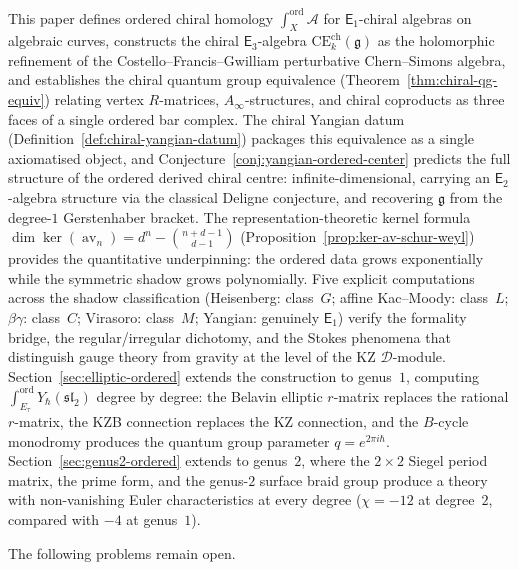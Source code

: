 \documentclass[11pt,reqno]{amsart}
\theoremstyle{definition}
\theoremstyle{remark}
\newcommand{\cA}{\mathcal{A}}
\newcommand{\cD}{\mathcal{D}}
\newcommand{\CE}{\mathrm{CE}}
\newcommand{\Ainf}{A_{\infty}}
\newcommand{\Eone}{\mathsf{E}_{1}}
\newcommand{\Etwo}{\mathsf{E}_{2}}
\newcommand{\Ethree}{\mathsf{E}_{3}}
\DeclareMathOperator{\av}{av}
\newcommand{\fg}{\mathfrak{g}}
\numberwithin{equation}{section}
\begin{document}
This paper defines ordered chiral homology
$\int_X^{\mathrm{ord}} \cA$ for $\Eone$-chiral algebras
on algebraic curves, constructs the chiral
$\Ethree$-algebra
$\CE^{\mathrm{ch}}_k(\fg)$ as the holomorphic
refinement of the Costello--Francis--Gwilliam perturbative
Chern--Simons algebra, and establishes the chiral quantum
group equivalence (Theorem~\ref{thm:chiral-qg-equiv})
relating vertex $R$-matrices, $\Ainf$-structures, and
chiral coproducts as three faces of a single ordered bar
complex.
The chiral Yangian datum
(Definition~\ref{def:chiral-yangian-datum}) packages
this equivalence as a single axiomatised object,
and Conjecture~\ref{conj:yangian-ordered-center} predicts
the full structure of the ordered derived chiral centre:
infinite-dimensional, carrying an $\Etwo$-algebra
structure via the classical Deligne conjecture, and
recovering $\fg$ from the degree-$1$ Gerstenhaber bracket.
The representation-theoretic kernel formula
$\dim\ker(\av_n) = d^n - \binom{n+d-1}{d-1}$
(Proposition~\ref{prop:ker-av-schur-weyl}) provides the
quantitative underpinning: the ordered data grows
exponentially while the symmetric shadow grows polynomially.
Five explicit computations across the shadow
classification (Heisenberg: class~$G$; affine Kac--Moody:
class~$L$; $\beta\gamma$: class~$C$; Virasoro:
class~$M$; Yangian: genuinely $\Eone$) verify the
formality bridge, the regular/irregular dichotomy,
and the Stokes phenomena that distinguish gauge theory
from gravity at the level of the KZ $\cD$-module.
Section~\ref{sec:elliptic-ordered} extends the construction
to genus~$1$, computing
$\int_{E_\tau}^{\mathrm{ord}} Y_\hbar(\mathfrak{sl}_2)$
degree by degree: the Belavin elliptic $r$-matrix replaces
the rational $r$-matrix, the KZB connection replaces the
KZ connection, and the $B$-cycle monodromy produces the
quantum group parameter $q = e^{2\pi i \hbar}$.
Section~\ref{sec:genus2-ordered} extends to genus~$2$,
where the $2 \times 2$ Siegel period matrix, the prime
form, and the genus-$2$ surface braid group produce a
theory with non-vanishing Euler characteristics at every
degree ($\chi = -12$ at degree~$2$, compared with $-4$ at
genus~$1$).

The following problems remain open.
\end{document}
